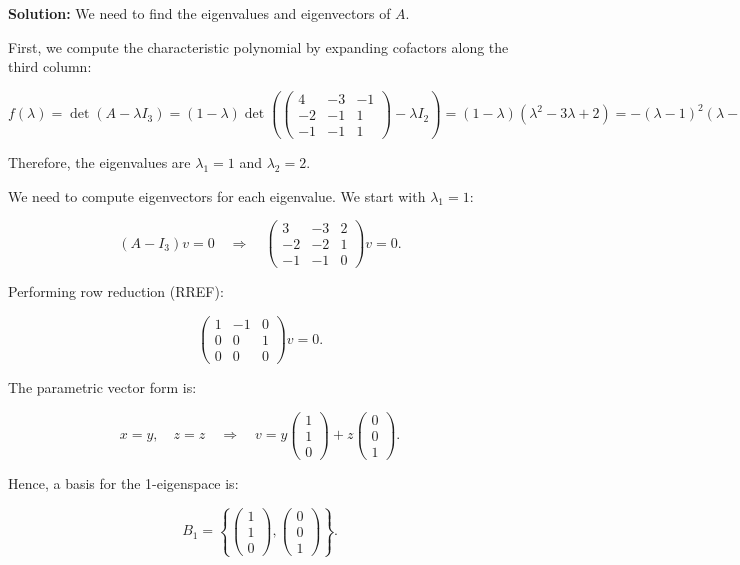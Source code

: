 \documentclass[a4paper,12pt]{article}
\begin{document}
\textbf{Solution:} We need to find the eigenvalues and eigenvectors of \( A \).

First, we compute the characteristic polynomial by expanding cofactors along the third column:

\[
f(\lambda) = \det(A - \lambda I_3) = (1 - \lambda) \det\left(\begin{pmatrix} 4 & -3 & -1 \\ -2 & -1 & 1 \\ -1 & -1 & 1 \end{pmatrix} - \lambda I_2\right) = (1 - \lambda)(\lambda^2 - 3\lambda + 2) = - (\lambda - 1)^2 (\lambda - 2).
\]

Therefore, the eigenvalues are \( \lambda_1 = 1 \) and \( \lambda_2 = 2 \).

We need to compute eigenvectors for each eigenvalue. We start with \( \lambda_1 = 1 \):

\[
(A - I_3) v = 0 \quad \Rightarrow \quad \begin{pmatrix} 3 & -3 & 2 \\ -2 & -2 & 1 \\ -1 & -1 & 0 \end{pmatrix} v = 0.
\]

Performing row reduction (RREF):

\[
\begin{pmatrix} 1 & -1 & 0 \\ 0 & 0 & 1 \\ 0 & 0 & 0 \end{pmatrix} v = 0.
\]

The parametric vector form is:

\[
x = y, \quad z = z \quad \Rightarrow \quad v = y \begin{pmatrix} 1 \\ 1 \\ 0 \end{pmatrix} + z \begin{pmatrix} 0 \\ 0 \\ 1 \end{pmatrix}.
\]

Hence, a basis for the 1-eigenspace is:

\[
B_1 = \left\{ \begin{pmatrix} 1 \\ 1 \\ 0 \end{pmatrix}, \begin{pmatrix} 0 \\ 0 \\ 1 \end{pmatrix} \right\}.
\]
\end{document}

